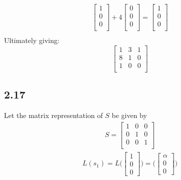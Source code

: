 \documentclass[letterpaper,12pt]{article}
\theoremstyle{definition}
\begin{document}
\begin{align*}
    \begin{bmatrix} 1 \\ 0 \\ 0 \\ \end{bmatrix} + 4\begin{bmatrix} 0 \\ 0 \\ 0 \\ \end{bmatrix} =
    \begin{bmatrix} 1 \\ 0 \\ 0 \\ \end{bmatrix} \\
\end{align*}
Ultimately giving:
\[
\begin{bmatrix}
    1 & 3 & 1 \\
    8 & 1 & 0 \\
    1 & 0 & 0 \\
\end{bmatrix}
\]
\subsection*{2.17}
Let the matrix representation of $S$ be given by
\begin{align*}
    S = 
    \begin{bmatrix}
        1 & 0 & 0 \\
        0 & 1 & 0 \\
        0 & 0 & 1 \\
    \end{bmatrix}
\end{align*}
\begin{align*}
    L(s_1) = L \Big(
    \begin{bmatrix}
        1\\
        0\\
        0
    \end{bmatrix}\Big)
    = \Big(
    \begin{bmatrix}
        \alpha\\
        0\\
        0
    \end{bmatrix}\Big)\\
\end{align*}
\end{document}
